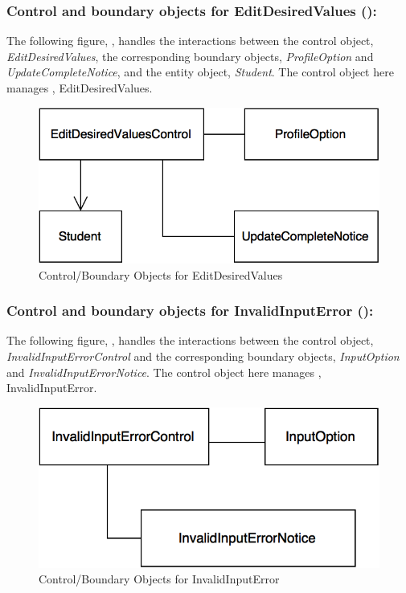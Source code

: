 \documentclass[12pt,letterpaper]{article}
\begin{document}
\subsubsection*{Control and boundary objects for EditDesiredValues ():}

The following figure, , handles the interactions between the control object, {\it EditDesiredValues}, the corresponding boundary objects, {\it ProfileOption} and {\it UpdateCompleteNotice}, and the entity object, {\it Student}. The control object here manages , EditDesiredValues.

\begin{figure}[H]
	\centering{}
	\includegraphics[scale=0.37]{imgs/cbod/edit-desired-values.png}
	\caption{Control/Boundary Objects for EditDesiredValues}
\end{figure}

\newpage{}

\subsubsection*{Control and boundary objects for InvalidInputError ():}

The following figure, , handles the interactions between the control object, {\it InvalidInputErrorControl} and the corresponding boundary objects, {\it InputOption} and {\it InvalidInputErrorNotice}. The control object here manages , InvalidInputError.

\begin{figure}[H]
	\centering{}
	\includegraphics[scale=0.37]{imgs/cbod/invalid-input-error.png}
	\caption{Control/Boundary Objects for InvalidInputError}
\end{figure}
\end{document}
